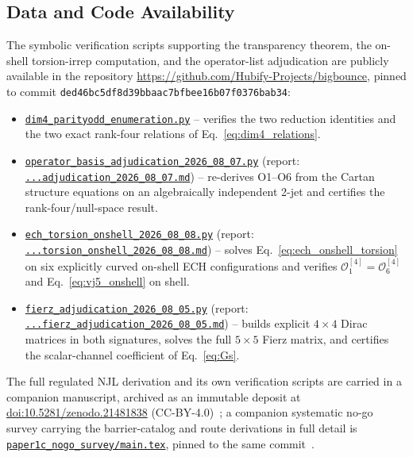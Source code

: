 \documentclass[aps,prd,twocolumn,superscriptaddress,preprintnumbers,nofootinbib,longbibliography,floatfix]{revtex4-2}
\newcommand{\repoSHA}{ded46bc5df8d39bbaac7bfbee16b07f0376bab34}
\newcommand{\artifactbase}[2]{\href{https://github.com/Hubify-Projects/bigbounce/blob/\repoSHA/#1}{\texttt{#2}}}
\begin{document}
\subsection*{Data and Code Availability}
The symbolic verification scripts supporting the transparency theorem,
the on-shell torsion-irrep computation, and the operator-list adjudication
are publicly available in the repository
\url{https://github.com/Hubify-Projects/bigbounce}, pinned to commit
\texttt{\repoSHA}:
\begin{itemize}[leftmargin=*,itemsep=2pt]
\item \artifactbase{arxiv/scripts/dim4_parityodd_enumeration.py}{dim4\_parityodd\_enumeration.py}
-- verifies the two reduction identities and the two exact rank-four
relations of Eq.~\eqref{eq:dim4_relations}.
\item \artifactbase{research/theory_audit/operator_basis_adjudication_2026_08_07.py}{operator\_basis\_adjudication\_2026\_08\_07.py}
(report: \artifactbase{research/theory_audit/operator_basis_adjudication_2026_08_07.md}{...adjudication\_2026\_08\_07.md})
-- re-derives O1--O6 from the Cartan structure equations on an
algebraically independent 2-jet and certifies the rank-four/null-space
result.
\item \artifactbase{research/theory_audit/ech_torsion_onshell_2026_08_08.py}{ech\_torsion\_onshell\_2026\_08\_08.py}
(report: \artifactbase{research/theory_audit/ech_torsion_onshell_2026_08_08.md}{...torsion\_onshell\_2026\_08\_08.md})
-- solves Eq.~\eqref{eq:ech_onshell_torsion} on six explicitly curved
on-shell ECH configurations and verifies $\mathcal O_1^{[4]}=\mathcal
O_6^{[4]}$ and Eq.~\eqref{eq:vj5_onshell} on shell.
\item \artifactbase{research/theory_audit/fierz_adjudication_2026_08_05.py}{fierz\_adjudication\_2026\_08\_05.py}
(report: \artifactbase{research/theory_audit/fierz_adjudication_2026_08_05.md}{...fierz\_adjudication\_2026\_08\_05.md})
-- builds explicit $4\times4$ Dirac matrices in both signatures, solves
the full $5\times5$ Fierz matrix, and certifies the scalar-channel
coefficient of Eq.~\eqref{eq:Gs}.
\end{itemize}
The full regulated NJL derivation and its own verification scripts are
carried in a companion manuscript, archived as an immutable deposit at
\href{https://doi.org/10.5281/zenodo.21481838}{doi:10.5281/zenodo.21481838}
(CC-BY-4.0)~\cite{Golden2026P1a}; a companion systematic no-go survey
carrying the barrier-catalog and route derivations in full detail is
\artifactbase{arxiv/paper1c_nogo_survey/main.tex}{paper1c\_nogo\_survey/main.tex},
pinned to the same commit~\cite{Golden2026P1cArxiv}.
\end{document}
